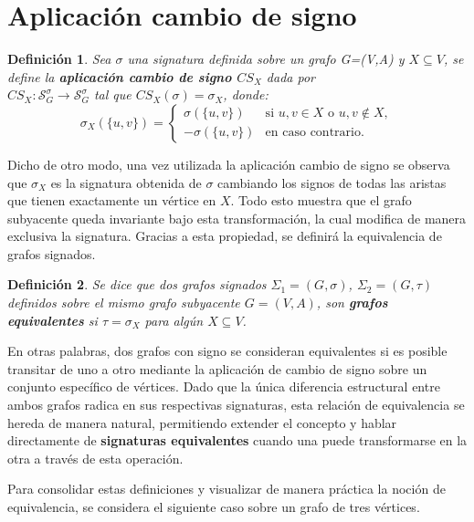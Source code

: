 \documentclass[11pt,a4paper,spanish]{report}
\theoremstyle{plain}
\newtheorem{definicion}{Definición}[chapter]
\begin{document}
\section{Aplicación cambio de signo}

\begin{definicion}\cite{zaslavsky1982signed} Sea $\sigma$ una signatura definida sobre un grafo G=(V,A) y $X \subseteq V$, se define la \textbf{aplicación cambio de signo $CS_X$} dada por \\
   $CS_X:\mathcal{S}^\sigma_G \rightarrow \mathcal{S}^\sigma_G$
tal que $CS_X(\sigma) = \sigma_X$, donde:
   \[
\sigma_X(\{u,v\}) = 
\begin{cases} 
\sigma(\{u,v\}) & \text{si } u, v \in X \text{ o } u, v \notin X, \\
-\sigma(\{u,v\}) & \text{en caso contrario}.%
\end{cases}
\]

\end{definicion}


Dicho de otro modo, una vez utilizada la aplicación cambio de signo se observa que $\sigma_X$ es la signatura obtenida de $\sigma$ cambiando los signos de todas las aristas que tienen exactamente un vértice en $X$. Todo esto muestra que el grafo subyacente queda invariante bajo esta transformación, la cual modifica de manera exclusiva la signatura. Gracias a esta propiedad, se definirá la equivalencia de grafos signados.

\begin{definicion}\cite{zaslavsky1982signed}\label{equivalencia}
Se dice que dos grafos signados $\Sigma_1=(G,\sigma)$, $\Sigma_2=(G,\tau)$ definidos sobre el mismo grafo subyacente $G=(V,A)$, son \textbf{grafos equivalentes} si $\tau=\sigma_X$ para algún $X \subseteq V$.
\end{definicion}

En otras palabras, dos grafos con signo se consideran equivalentes si es posible transitar de uno a otro mediante la aplicación de cambio de signo sobre un conjunto específico de vértices. Dado que la única diferencia estructural entre ambos grafos radica en sus respectivas signaturas, esta relación de equivalencia se hereda de manera natural, permitiendo extender el concepto y hablar directamente de \textbf{signaturas equivalentes} cuando una puede transformarse en la otra a través de esta operación.

Para consolidar estas definiciones y visualizar de manera práctica la noción de equivalencia, se considera el siguiente caso sobre un grafo de tres vértices.
\end{document}
